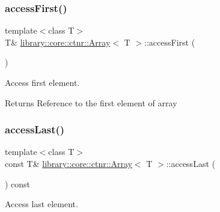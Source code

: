 \subsubsection{\texorpdfstring{accessFirst()}{accessFirst()}\hspace{0.1cm}{\footnotesize\ttfamily [2/2]}}
{\footnotesize\ttfamily template$<$class T$>$ \\
T\& \mbox{\hyperlink{classlibrary_1_1core_1_1ctnr_1_1_array}{library\+::core\+::ctnr\+::\+Array}}$<$ T $>$\+::access\+First (\begin{DoxyParamCaption}{ }\end{DoxyParamCaption})}



Access first element. 


\begin{DoxyCode}{0}
\end{DoxyCode}


\begin{DoxyReturn}{Returns}
Reference to the first element of array 
\end{DoxyReturn}
\mbox{\label{classlibrary_1_1core_1_1ctnr_1_1_array_ad95dcce8ddaf163903a2327f766dbc8a}} 
\subsubsection{\texorpdfstring{accessLast()}{accessLast()}\hspace{0.1cm}{\footnotesize\ttfamily [1/2]}}
{\footnotesize\ttfamily template$<$class T$>$ \\
const T\& \mbox{\hyperlink{classlibrary_1_1core_1_1ctnr_1_1_array}{library\+::core\+::ctnr\+::\+Array}}$<$ T $>$\+::access\+Last (\begin{DoxyParamCaption}{ }\end{DoxyParamCaption}) const}



Access last element. 


\begin{DoxyCode}{0}
\end{DoxyCode}


